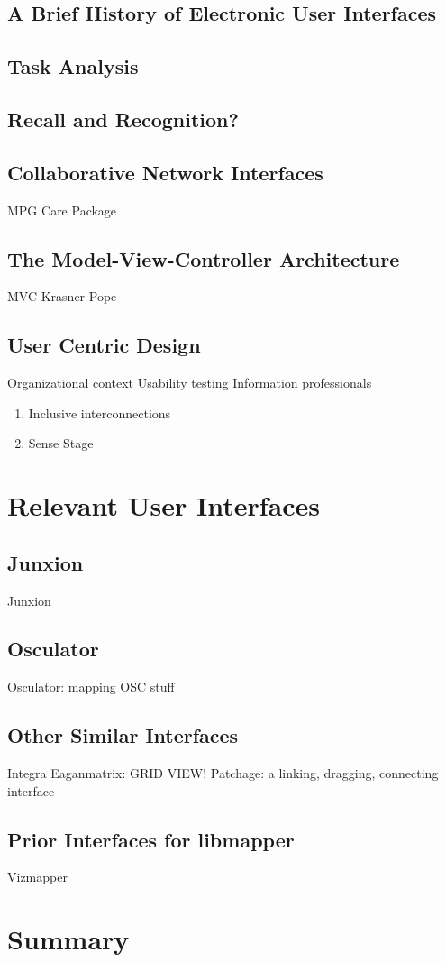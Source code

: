	\subsection{A Brief History of Electronic User Interfaces}
	\subsection{Task Analysis}
	\subsection{Recall and Recognition?}
	\subsection{Collaborative Network Interfaces}
		MPG Care Package 
	\subsection{The Model-View-Controller Architecture}
		MVC Krasner Pope 
	\subsection{User Centric Design}
		Organizational context 
		Usability testing 
		Information professionals 
	\begin{enumerate}
		\item Inclusive interconnections 
		\item Sense Stage 
	\end{enumerate}

\section{Relevant User Interfaces}
	\subsection{Junxion}
		Junxion 
	\subsection{Osculator}
		Osculator: mapping OSC stuff 
	\subsection{Other Similar Interfaces}
		Integra 
		Eaganmatrix: GRID VIEW! 
		Patchage: a linking, dragging, connecting interface 
	\subsection{Prior Interfaces for libmapper} \label{sec:priorGUIs}
		Vizmapper 
	

\section{Summary}
	